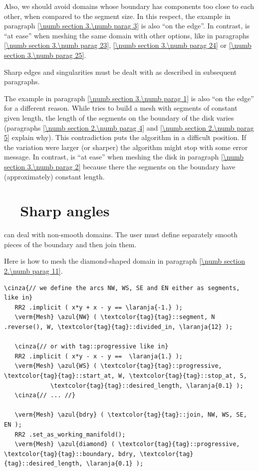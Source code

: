 Also, we should avoid domains whose boundary has components too close to each other,
when compared to the segment size.
In this respect, the example in paragraph \ref{\numb section 3.\numb parag 3} is also
``on the edge''.
In contrast, {\maniFEM} is ``at ease'' when meshing the same domain with other options,
like in paragraphs \ref{\numb section 3.\numb parag 23}, \ref{\numb section 3.\numb parag 24}
or \ref{\numb section 3.\numb parag 25}.

Sharp edges and singularities must be dealt with as described in subsequent paragraphs.

The example in paragraph \ref{\numb section 3.\numb parag 1} is also ``on the edge''
for a different reason.
While {\maniFEM} tries to build a mesh with segments of constant given length,
the length of the segments on the boundary of the disk varies (paragraphs
\ref{\numb section 2.\numb parag 4} and \ref{\numb section 2.\numb parag 5} explain why).
This contradiction puts the algorithm in a difficult position.
If the variation were larger (or sharper) the algorithm might stop with some error message.
In contrast, {\maniFEM} is ``at ease'' when meshing the disk in paragraph
\ref{\numb section 3.\numb parag 2} because there the segments on the boundary have
(approximately) constant length.


\section{~~Sharp angles}\label{\numb section 3.\numb parag 17}

{\ManiFEM} can deal with non-smooth domains.
The user must define separately smooth pieces of the boundary and then join them.

Here is how to mesh the diamond-shaped domain in paragraph \ref{\numb section 2.\numb parag 11}.

\begin{Verbatim}[commandchars=\\\{\},formatcom=\small\tt,frame=single,
   label=parag-\ref{\numb section 3.\numb parag 17}.cpp,rulecolor=\color{coment},
   baselinestretch=0.94,framesep=2mm                                            ]
   \cinza{// we define the arcs NW, WS, SE and EN either as segments, like in}
   RR2 .implicit ( x*y + x - y == \laranja{-1.} );
   \verm{Mesh} \azul{NW} ( \textcolor{tag}{tag}::segment, N .reverse(), W, \textcolor{tag}{tag}::divided_in, \laranja{12} );
   
   \cinza{// or with tag::progressive like in}
   RR2 .implicit ( x*y - x - y ==  \laranja{1.} );
   \verm{Mesh} \azul{WS} ( \textcolor{tag}{tag}::progressive, \textcolor{tag}{tag}::start_at, W, \textcolor{tag}{tag}::stop_at, S,
             \textcolor{tag}{tag}::desired_length, \laranja{0.1} );
   \cinza{// ... //}
             
   \verm{Mesh} \azul{bdry} ( \textcolor{tag}{tag}::join, NW, WS, SE, EN );
   RR2 .set_as_working_manifold();
   \verm{Mesh} \azul{diamond} ( \textcolor{tag}{tag}::progressive, \textcolor{tag}{tag}::boundary, bdry, \textcolor{tag}{tag}::desired_length, \laranja{0.1} );
\end{Verbatim}


